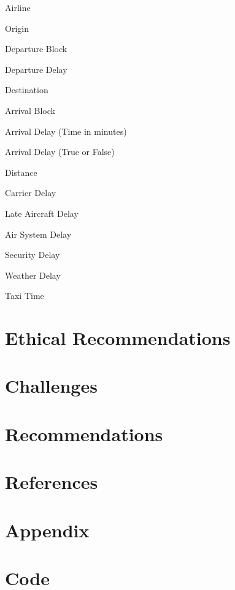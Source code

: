 \documentclass[a4paper,12pt]{article}
\begin{document}
Airline

Origin

Departure Block

Departure Delay

Destination

Arrival Block

Arrival Delay (Time in minutes)

Arrival Delay (True or False)

Distance 

Carrier Delay

Late Aircraft Delay

Air System Delay

Security Delay

Weather Delay

Taxi Time

\section{Ethical Recommendations}

\section{Challenges}

\section{Recommendations}

\section{References}

\section{Appendix}

\section{Code}
\end{document}
